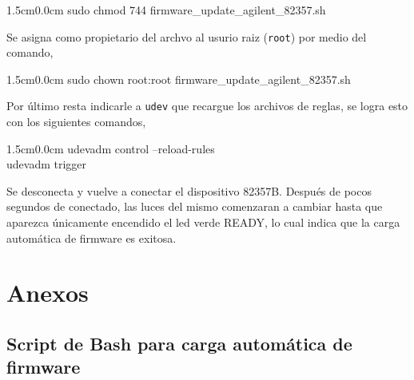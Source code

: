\documentclass[paper=letter,oneside,fontsize=11pt, parskip=full]{scrartcl}
\newenvironment{code}
	{\begin{adjustwidth}{1.5cm}{0.0cm}\ttfamily}
	{\end{adjustwidth}}
\begin{document}
	\begin{code}
		sudo chmod 744 firmware\_update\_agilent\_82357.sh
	\end{code}

	Se asigna como propietario del archvo al usurio raiz (\texttt{root}) por medio del comando,
	
	\begin{code}
		sudo chown root:root firmware\_update\_agilent\_82357.sh
	\end{code}

	Por último resta indicarle a \texttt{udev} que recargue los archivos de reglas, se logra esto con los siguientes comandos, 
	
	\begin{code}
		udevadm control --reload-rules \\
		udevadm trigger
	\end{code}

	Se desconecta y vuelve a conectar el dispositivo 82357B. Después de pocos segundos de conectado, las luces del mismo comenzaran a cambiar hasta que aparezca únicamente encendido el led verde READY, lo cual indica que la carga automática de firmware es exitosa.
	
	\newpage
			
	\section{Anexos}	
		
	\subsection{Script de Bash para carga automática de firmware}
	\label{Sec:FirmwareUploadScript}
	
\end{document}
